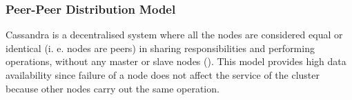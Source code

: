 \subsubsection{Peer-Peer Distribution Model}
Cassandra is a decentralised system  where all the nodes are considered equal
or identical (i. e.  nodes are peers) in sharing responsibilities and performing
operations,  without any  master or slave nodes (). 
This model provides high data availability since failure
of a node does not affect the service of the cluster  because other
nodes carry out the same operation. 


